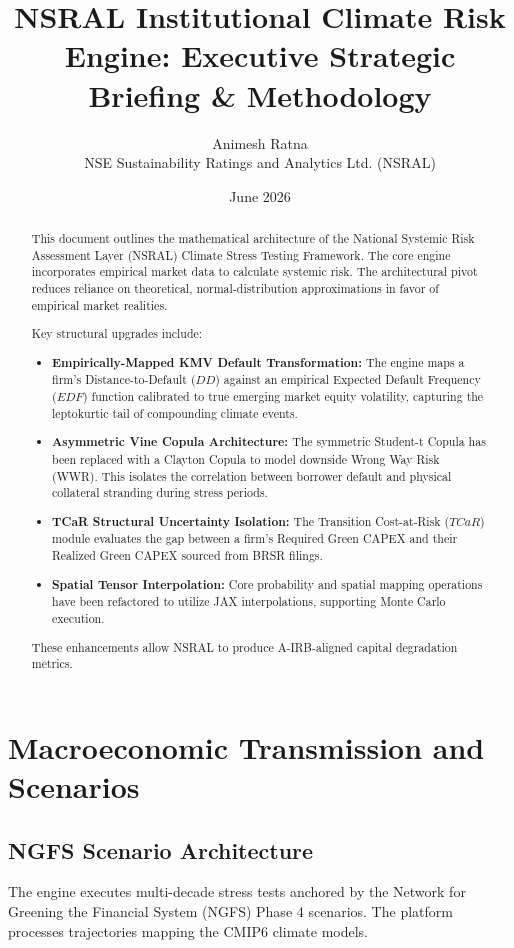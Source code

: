 \documentclass[11pt]{article}
\title{\textbf{NSRAL Institutional Climate Risk Engine: Executive Strategic Briefing \& Methodology}}
\author{Animesh Ratna \\ NSE Sustainability Ratings and Analytics Ltd. (NSRAL)}
\date{June 2026}
\begin{document}
\maketitle

\tableofcontents
\newpage

\begin{abstract}
\noindent This document outlines the mathematical architecture of the National Systemic Risk Assessment Layer (NSRAL) Climate Stress Testing Framework. The core engine incorporates empirical market data to calculate systemic risk. The architectural pivot reduces reliance on theoretical, normal-distribution approximations in favor of empirical market realities. 

Key structural upgrades include:
\begin{itemize}
    \item \textbf{Empirically-Mapped KMV Default Transformation:} The engine maps a firm's Distance-to-Default ($DD$) against an empirical Expected Default Frequency ($EDF$) function calibrated to true emerging market equity volatility, capturing the leptokurtic tail of compounding climate events.
    \item \textbf{Asymmetric Vine Copula Architecture:} The symmetric Student-t Copula has been replaced with a Clayton Copula to model downside Wrong Way Risk (WWR). This isolates the correlation between borrower default and physical collateral stranding during stress periods.
    \item \textbf{TCaR Structural Uncertainty Isolation:} The Transition Cost-at-Risk ($TCaR$) module evaluates the gap between a firm's Required Green CAPEX and their Realized Green CAPEX sourced from BRSR filings.
    \item \textbf{Spatial Tensor Interpolation:} Core probability and spatial mapping operations have been refactored to utilize JAX interpolations, supporting Monte Carlo execution.
\end{itemize}
These enhancements allow NSRAL to produce A-IRB-aligned capital degradation metrics.
\end{abstract}

\section{Macroeconomic Transmission and Scenarios}
\subsection{NGFS Scenario Architecture}
The engine executes multi-decade stress tests anchored by the Network for Greening the Financial System (NGFS) Phase 4 scenarios. The platform processes trajectories mapping the CMIP6 climate models.
\end{document}
